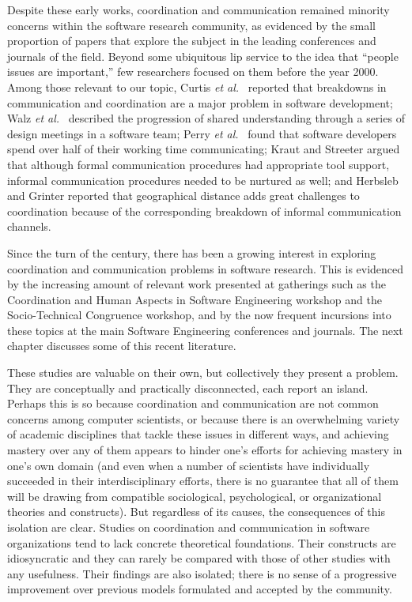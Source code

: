 Despite these early works, coordination and communication remained minority concerns within the software research community, as evidenced by the small proportion of papers that explore the subject in the leading conferences and journals of the field. Beyond some ubiquitous lip service to the idea that ``people issues are important,'' few researchers focused on them before the year 2000. Among those relevant to our topic, Curtis \emph{et al.}\  reported that breakdowns in communication and coordination are a major problem in software development; Walz \emph{et al.}\  described the progression of shared understanding through a series of design meetings in a software team; Perry \emph{et al.}\  found that software developers spend over half of their working time communicating; Kraut and Streeter  argued that although formal communication procedures had appropriate tool support, informal communication procedures needed to be nurtured as well; and Herbsleb and Grinter  reported that geographical distance adds great challenges to coordination because of the corresponding breakdown of informal communication channels.

Since the turn of the century, there has been a growing interest in exploring coordination and communication problems in software research. This is evidenced by the increasing amount of relevant work presented at gatherings such as the Coordination and Human Aspects in Software Engineering workshop and the Socio-Technical Congruence workshop, and by the now frequent incursions into these topics at the main Software Engineering conferences and journals. The next chapter discusses some of this recent literature.

These studies are valuable on their own, but collectively they present a problem. They are conceptually and practically disconnected, each report an island. Perhaps this is so because coordination and communication are not common concerns among computer scientists, or because there is an overwhelming variety of academic disciplines that tackle these issues in different ways, and achieving mastery over any of them appears to hinder one's efforts for achieving mastery in one's own domain (and even when a number of scientists have individually succeeded in their interdisciplinary efforts, there is no guarantee that all of them will be drawing from compatible sociological, psychological, or organizational theories and constructs). But regardless of its causes, the consequences of this isolation are clear. Studies on coordination and communication in software organizations tend to lack concrete theoretical foundations. Their constructs are idiosyncratic and they can rarely be compared with those of other studies with any usefulness. Their findings are also isolated; there is no sense of a progressive improvement over previous models formulated and accepted by the community.

